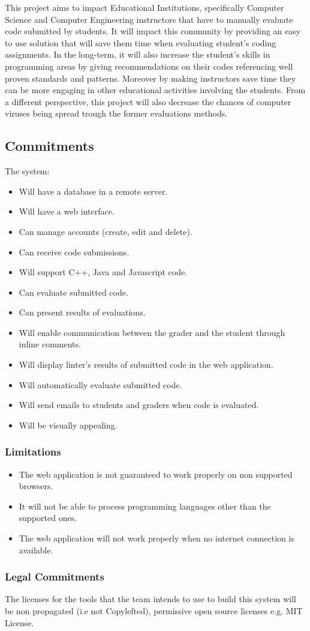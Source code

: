 
This project aims to impact Educational Institutions, specifically Computer Science and
Computer Engineering instructors that have to manually evaluate code submitted
by students. It will impact this community by providing an easy to use solution
that will save them time when evaluating student's coding assignments. In the
long-term, it will also increase the student's skills in programming areas by
giving recommendations on their codes referencing well proven standards and
patterns. Moreover by making instructors save time they can be more engaging in
other educational activities involving the students. From a different
perspective, this project will also decrease the chances of computer viruses being spread
trough the former evaluations methods.

\subsection{Commitments}
The system:
\begin{itemize}
\item Will have a database in a remote server.
\item Will have a web interface.
\item Can manage accounts (create, edit and delete).
\item Can receive code submissions.
\item Will support C++, Java and Javascript code.
\item Can evaluate submitted code.
\item Can present results of evaluations.
\item Will enable communication between the grader and the student through
inline comments.
\item Will display linter's results of submitted code in the web application.
\item Will automatically evaluate submitted code.
\item Will send emails to students and graders when code is evaluated.
\item Will be visually appealing.
\end{itemize}

\subsubsection{Limitations}
\begin{itemize}
\item The web application is not guaranteed to work properly on non supported
browsers.
\item It will not be able to process programming languages other than the
supported ones.
\item The web application will not work properly when no internet connection is
available.
\end{itemize}

\subsubsection{Legal Commitments}

The licenses for the tools that the team intends to use to build this system will be non
propagated (i.e not Copylefted), permissive open source licenses e.g. MIT
License.
